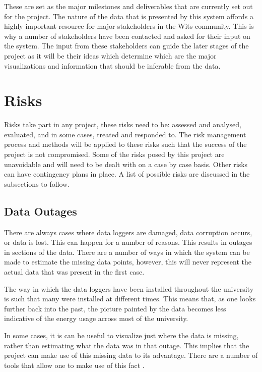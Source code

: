 \documentclass[12pt,onecolumn]{IEEEtran}
\begin{document}
These are set as the major milestones and deliverables that are currently set out for the project. The nature of the data that is presented by this system affords a highly important resource for major stakeholders in the Wits community. This is why a number of stakeholders have been contacted and asked for their input on the system. 
The input from these stakeholders can guide the later stages of the project as it will be their ideas which determine which are the major visualizations and information that should be inferable from the data.


\section{Risks} \label{sec:Risks}
Risks take part in any project, these risks need to be: assessed and analysed, evaluated, and in some cases, treated and responded to.
The risk management process and methods will be applied to these risks such that the success of the project is not  compromised.
Some of the risks posed by this project are unavoidable and will need to be dealt with on a case by case basis. 
Other risks can have contingency plans in place. 
A list of possible risks are discussed in the subsections to follow.


\subsection{Data Outages} \label{sec:DataOutages}
There are always cases where data loggers are damaged, data corruption occurs, or data is lost. This can happen for a number of reasons. This results in outages in sections of the data. 
There are a number of ways in which the system can be made to estimate the missing data points, however, this will never represent the actual data that was present in the first case. 

The way in which the data loggers have been installed throughout the university is such that many were installed at different times. 
This means that, as one looks further back into the past, the picture painted by the data becomes less indicative of the energy usage across most of the university. 

In some cases, it is can be useful to visualize just where the data is missing, rather than estimating what the data was in that outage.
This implies that the project can make use of this missing data to its advantage. There are a number of tools that allow one to make use of this fact \cite{missingdata1,missingdata2}.
\end{document}

